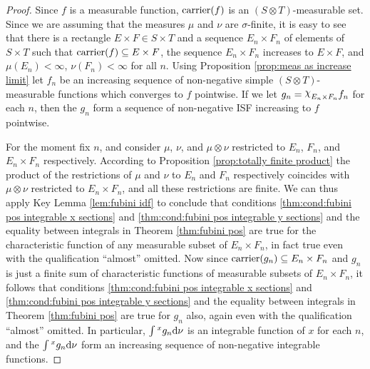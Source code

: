 \begin{proof}
Since $f$ is a measurable function, $\car{f}$ is an $(S\otimes T)$-measurable set. Since we are assuming that the measures $\mu$ and $\nu$ are $\sigma$-finite, it is easy to see that there is a rectangle $E\times F\in S\times T$ and a sequence $E_n\times F_n$ of elements of $S\times T$ such that $\car{f}\subseteq E\times F$, the sequence $E_n\times F_n$ increases to $E\times F$, and $\mu(E_n)<\infty$, $\nu(F_n)<\infty$ for all $n$. Using Proposition \ref{prop:meas as increase limit} let $f_n$ be an increasing sequence of non-negative simple $(S\otimes T)$-measurable functions which converges to $f$ pointwise. If we let $g_n=\idf{E_n\times F_n}f_n$ for each $n$, then the $g_n$ form a sequence of non-negative ISF increasing to $f$ pointwise.

For the moment fix $n$, and consider $\mu$, $\nu$, and $\mu\otimes\nu$ restricted to $E_n$, $F_n$, and $E_n\times F_n$ respectively. According to Proposition \ref{prop:totally finite product} the product of the restrictions of $\mu$ and $\nu$ to $E_n$ and $F_n$ respectively coincides with $\mu\otimes\nu$ restricted to $E_n\times F_n$, and all these restrictions are finite. We can thus apply Key Lemma \ref{lem:fubini idf} to conclude that conditions \ref{thm:cond:fubini pos integrable x sections} and \ref{thm:cond:fubini pos integrable y sections} and the equality between integrals in Theorem \ref{thm:fubini pos} are true for the characteristic function of any measurable subset of $E_n\times F_n$, in fact true even with the qualification ``almost'' omitted. Now since $\car{g_n}\subseteq E_n\times F_n$ and $g_n$ is just a finite sum of characteristic functions of measurable subsets of $E_n\times F_n$, it follows that conditions \ref{thm:cond:fubini pos integrable x sections} and \ref{thm:cond:fubini pos integrable y sections} and the equality between integrals in Theorem \ref{thm:fubini pos} are true for $g_n$ also, again even with the qualification ``almost'' omitted. In particular, $\int\xsec{g_n}{x}\dd\nu$ is an integrable function of $x$ for each $n$, and the $\int\xsec{g_n}{x}\dd\nu$ form an increasing sequence of non-negative integrable functions.


\end{proof}
